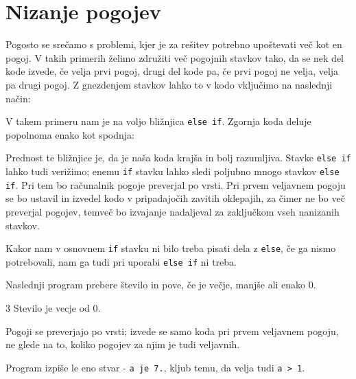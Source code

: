 \documentclass{book}
\begin{document}
\section{Nizanje pogojev}

Pogosto se srečamo s problemi, kjer je za rešitev potrebno upoštevati več kot
en pogoj. V takih primerih želimo združiti več pogojnih stavkov tako, da se
nek del kode izvede, če velja prvi pogoj, drugi del kode pa, če prvi pogoj
ne velja, velja pa drugi pogoj. Z gnezdenjem stavkov lahko to v kodo vključimo
na naslednji način:


V takem primeru nam je na voljo bližnjica \verb+else if+. Zgornja koda deluje
popolnoma enako kot spodnja:


Prednost te bližnjice je, da je naša koda krajša in bolj razumljiva.
Stavke \verb+else if+ lahko tudi verižimo; enemu \verb+if+ stavku lahko sledi
poljubno mnogo stavkov \verb+else if+. Pri tem bo računalnik pogoje preverjal po
vrsti. Pri prvem veljavnem pogoju se bo ustavil in izvedel kodo v pripadajočih
zavitih oklepajih, za čimer ne bo več preverjal pogojev, temveč bo izvajanje
nadaljeval za zaključkom vseh nanizanih stavkov.

Kakor nam v osnovnem \verb+if+ stavku ni bilo treba pisati dela z \verb+else+,
če ga nismo potrebovali, nam ga tudi pri uporabi \verb+else if+ ni treba.

\begin{examples}
Naslednji program prebere število in pove, če je večje, manjše ali enako 0.


\begin{inout}
3
\tcblower
Stevilo je vecje od 0.
\end{inout}

\end{examples}

\begin{examples}
Pogoji se preverjajo po vrsti; izvede se samo koda pri prvem veljavnem pogoju,
ne glede na to, koliko pogojev za njim je tudi veljavnih.


Program izpiše le eno stvar - \verb+a je 7.+, kljub temu, da velja tudi
\verb+a > 1+.

\end{examples}
\end{document}
